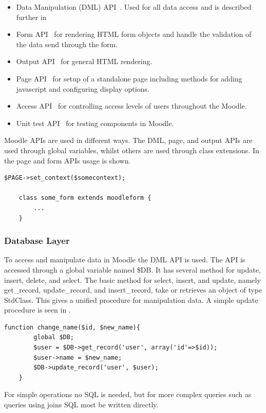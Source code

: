 	\begin{itemize}
		\item Data Manipulation (DML) API~\cite{moodledml}. Used for all data access and is described further in 
		\item Form API~\cite{moodleformapi} for rendering HTML form objects and handle the validation of the data send through the form. 
		\item Output API~\cite{moodleoutputapi} for general HTML rendering.
		\item Page API~\cite{moodlepageapi} for setup of a standalone page including methods for adding javascript and configuring display options. 
		\item Access API~\cite{moodleaccessapi} for controlling access levels of users throughout the Moodle. 
		\item Unit test API~\cite{moodleunittestapi} for testing components in Moodle. 
	\end{itemize}
	Moodle APIs are used in different ways. The DML, page, and output APIs are used through global variables, whilst others are used through class extensions. In~ the page and form APIs usage is shown.
	\begin{lstlisting}[style=phpCode, caption=\myCaption{Example of the Page and form APIs in Moodle}, label=moodleapiusage]
	$PAGE->set_context($somecontext);
	
	class some_form extends moodleform {
		...
	}
	\end{lstlisting}

	
	\subsubsection{Database Layer}
	\label{sec:moodleoplatformdbml}
	To access and manipulate data in Moodle the DML API is used.  The API is accessed through a global variable named \$DB. It has several method for update, insert, delete, and select. 
	The basic method for select, insert, and update, namely get\_record, update\_record, and insert\_record, take or retrieves an object of type StdClass. This gives a unified procedure for manipulation data. A simple update procedure is seen in .
	\begin{lstlisting}[style=phpCode, caption=\myCaption{Example of how to change the name of an user}, label=moodlecodeupdate]
	function change_name($id, $new_name){
		global $DB;
		$user = $DB->get_record('user', array('id'=>$id));
		$user->name = $new_name;
		$DB->update_record('user', $user);
	}
	\end{lstlisting}
	For simple operations no SQL is needed, but for more complex queries such as queries using joins SQL most be written directly. 
	
